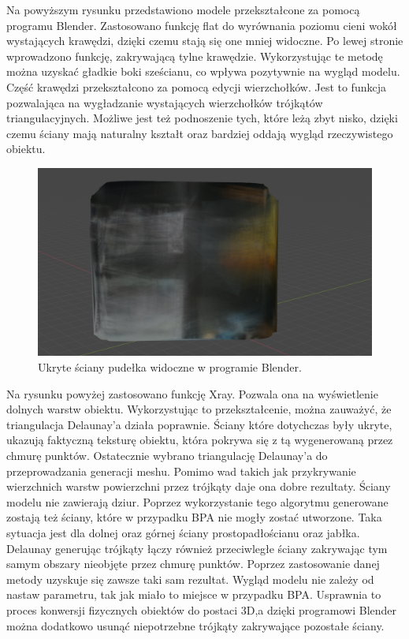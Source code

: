 Na powyższym rysunku przedstawiono modele przekształcone za pomocą programu Blender. Zastosowano funkcję flat do wyrównania poziomu cieni wokół wystających krawędzi, dzięki czemu stają się one mniej widoczne. Po lewej stronie wprowadzono funkcję, zakrywającą tylne krawędzie. Wykorzystując te metodę można uzyskać gładkie boki sześcianu, co wpływa pozytywnie na wygląd modelu. Część krawędzi przekształcono za pomocą edycji wierzchołków. Jest to funkcja pozwalająca na wygładzanie wystających wierzchołków trójkątów triangulacyjnych. Możliwe jest też podnoszenie tych, które leżą zbyt nisko, dzięki czemu ściany mają naturalny kształt oraz bardziej oddają wygląd rzeczywistego obiektu. 
\begin{figure}[H]
  \centering
  \includegraphics[scale=0.16]{delaBlendBoxXray.png}
  \caption{Ukryte ściany pudełka widoczne w programie Blender.}   
  \label{fig:pytcytpic}
\end{figure}
Na rysunku powyżej zastosowano funkcję Xray. Pozwala ona na wyświetlenie dolnych warstw obiektu. Wykorzystując to przekształcenie, można zauważyć, że triangulacja Delaunay'a działa poprawnie. Ściany które dotychczas były ukryte, ukazują faktyczną teksturę obiektu, która pokrywa się z tą wygenerowaną przez chmurę punktów.
\newline \indent Ostatecznie wybrano triangulację Delaunay'a do przeprowadzania generacji meshu. Pomimo wad takich jak przykrywanie wierzchnich warstw powierzchni przez trójkąty daje ona dobre rezultaty. Ściany modelu nie zawierają dziur. Poprzez wykorzystanie tego algorytmu generowane zostają też ściany, które w przypadku BPA nie mogły zostać utworzone. Taka sytuacja jest dla dolnej oraz górnej ściany prostopadłościanu oraz jabłka. Delaunay generując trójkąty łączy również przeciwległe ściany zakrywając tym samym obszary nieobjęte przez chmurę punktów. Poprzez zastosowanie danej metody uzyskuje się zawsze taki sam rezultat. Wygląd modelu nie zależy od nastaw parametru, tak jak miało to miejsce w przypadku BPA. Usprawnia to proces konwersji fizycznych obiektów do postaci 3D,a dzięki programowi Blender można dodatkowo usunąć niepotrzebne trójkąty zakrywające pozostałe ściany.
\newpage



